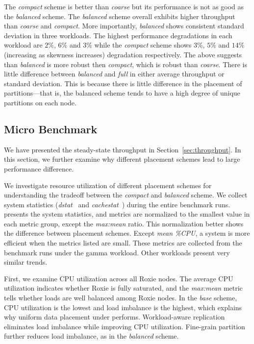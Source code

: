 The \emph{compact} scheme is better than \emph{coarse} but its performance is not as
good as the \emph{balanced} scheme.
The \emph{balanced} scheme overall exhibits higher throughput than
\emph{coarse} and \emph{compact}.
More importantly, \emph{balanced} shows consistent standard deviation
in three workloads.
The highest performance degradations in each workload are
$2\%$, $6\%$ and $3\%$
while the \emph{compact} scheme shows
$3\%$, $5\%$ and $14\%$ (increasing as skewness increases) degradation respectively.
The above suggests than \emph{balanced} is more robust then
\emph{compact}, which is robust than \emph{coarse}.
There is little difference between \emph{balanced} and \emph{full} in either
average throughput or standard deviation.
This is because there is little difference in the placement of
partitions---that is, the balanced scheme tends to have a high degree of
unique partitions on each node.



\subsection{Micro Benchmark}

We have presented the steady-state throughput in Section~\ref{sec:throughput}.
In this section, we further examine why different placement schemes
lead to large performance difference.

We investigate resource utilization of different placement schemes
for understanding the tradeoff between the \emph{compact} and
\emph{balanced} scheme. 
We collect system statistics
(\textit{dstat}~\cite{dstat} and \textit{cachestat}~\cite{cachestat})
during the entire benchmark runs.
\mytable{\ref{tab:micro_nfs}} presents the system statistics, and
metrics are normalized to the smallest value in each metric group,
except the \emph{max:mean} ratio. 
This normalization better shows the difference between placement schemes.
Except \emph{mean \%CPU}, a system is more efficient when
the metrics listed are small.
These metrics are collected from the benchmark runs under the gamma workload.
Other workloads present very similar trends.

First, we examine CPU utilization across all Roxie nodes.
The average CPU utilization indicates whether Roxie is fully saturated,
and the \emph{max:mean} metric tells whether loads are well balanced
among Roxie nodes.
In the \emph{base} scheme, CPU utilization is the lowest and load imbalance
is the highest, which explains why uniform data placement under performs.
Workload-aware replication eliminates load imbalance while
improving CPU utilization.
Fine-grain partition further reduces load imbalance,
as in the \emph{balanced} scheme.

